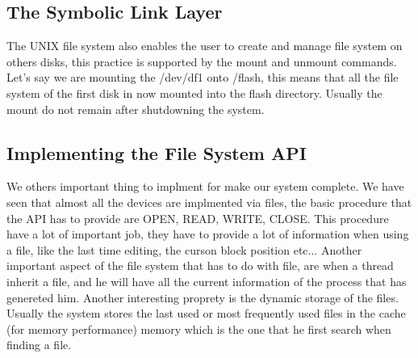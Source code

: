 \documentclass{article}
\begin{document}
    \subsection{The Symbolic Link Layer}
      The UNIX file system also enables the user to create and manage file system on others
      disks, this practice is supported by the mount and unmount commands. Let's say 
      we are mounting the /dev/df1 onto /flash, this means that all the file system of 
      the first disk in now mounted into the flash directory. Usually the mount do not
      remain after shutdowning the system.
    \subsection{Implementing the File System API}
      We others important thing to implment for make our system complete. We have seen 
      that almost all the devices are implmented via files, the basic procedure that the API
      has to provide are OPEN, READ, WRITE, CLOSE. This procedure have a lot of important 
      job, they have to provide a lot of information when using a file, like the last time
      editing, the curson block position etc... Another important aspect of the file system
      that has to do with file, are when a thread inherit a file, and he will have all 
      the current information of the process that has genereted him. Another interesting 
      proprety is the dynamic storage of the files. Usually the system stores the last used
      or most frequently used files in the cache (for memory performance) memory which is the one that he first search
      when finding a file.
\end{document}
